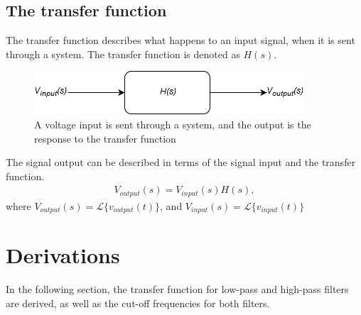 \subsection{The transfer function} \label{sub:TTF}
The transfer function describes what happens to an input signal, when it is sent through a system. The transfer function is denoted as $H(s)$.
\\
\begin{figure}[H]
\center
\includegraphics[scale=0.6]{fig/img/transfer_function.png}
\caption{A voltage input is sent through a system, and the output is the response to the transfer function}
\label{fig:transfer}
\end{figure}
\noindent
The signal output can be described in terms of the signal input and the transfer function.
\begin{align*}
V_{output}(s)=V_{input}(s)H(s),
\end{align*}
where $V_{output}(s)=\mathcal{L}\{v_{output}(t)\}$, and $V_{input}(s)=\mathcal{L}\{v_{input}(t)\}$

\section{Derivations} \label{Derivations}
In the following section, the transfer function for low-pass and high-pass filters are derived, as well as the cut-off frequencies for both filters.

